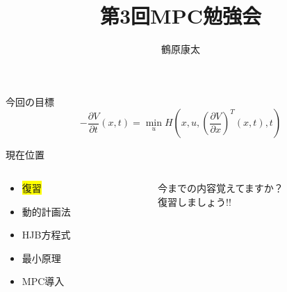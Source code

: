 \documentclass[dvipdfmx,12pt]{beamer}
\title{第3回MPC勉強会}
\author{鶴原康太}
\begin{document}
    \frame{\maketitle}

    \begin{frame}{今回の目標}
        \begin{equation*}
            -\frac{\partial V}{\partial t}\left(x,t\right) = \min _u H\left(x, u, \left( \frac{\partial V}{\partial x} \right)^T\left(x, t\right), t \right)
        \end{equation*}
    \end{frame}

    \begin{frame}{現在位置}
        \begin{columns}
            \begin{column}{.5\textwidth}
                \begin{itemize}
                    \item \colorbox{yellow}{復習}
                    \item 動的計画法
                    \item HJB方程式
                    \item 最小原理
                    \item MPC導入
                \end{itemize}
            \end{column}
    
            \begin{column}{.5\textwidth}
                今までの内容覚えてますか？\\
                復習しましょう!!
            \end{column}
        \end{columns}
    \end{frame}
\end{document}
